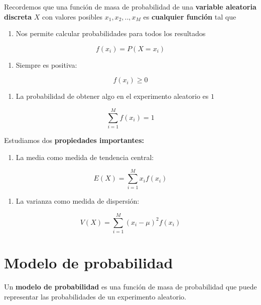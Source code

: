 \documentclass[
]{book}
\providecommand{\tightlist}{%
  \setlength{\itemsep}{0pt}\setlength{\parskip}{0pt}}
\begin{document}
Recordemos que una función de masa de probabilidad de una \textbf{variable aleatoria discreta} \(X\) con valores posibles \(x_1 , x_2 , .. , x_M\) es \textbf{cualquier función} tal que

\begin{enumerate}
\def\labelenumi{\arabic{enumi})}
\tightlist
\item
  Nos permite calcular probabilidades para todos los resultados
\end{enumerate}

\[f(x_i)=P(X=x_i)\]

\begin{enumerate}
\def\labelenumi{\arabic{enumi})}
\setcounter{enumi}{1}
\tightlist
\item
  Siempre es positiva:
\end{enumerate}

\[f(x_i)\geq 0\]

\begin{enumerate}
\def\labelenumi{\arabic{enumi})}
\setcounter{enumi}{2}
\tightlist
\item
  La probabilidad de obtener algo en el experimento aleatorio es \(1\)
\end{enumerate}

\[\sum_{i=1}^M f(x_i)=1\]

Estudiamos dos \textbf{propiedades importantes:}

\begin{enumerate}
\def\labelenumi{\arabic{enumi})}
\tightlist
\item
  La media como medida de tendencia central:
\end{enumerate}

\[E(X)= \sum_{i=1}^M x_i f(x_i)\]

\begin{enumerate}
\def\labelenumi{\arabic{enumi})}
\setcounter{enumi}{1}
\tightlist
\item
  La varianza como medida de dispersión:
\end{enumerate}

\[V(X)= \sum_{i=1}^M (x_i-\mu)^2 f(x_i)\]

\hypertarget{modelo-de-probabilidad}{%
\section{Modelo de probabilidad}\label{modelo-de-probabilidad}}

Un \textbf{modelo de probabilidad} es una función de masa de probabilidad que puede representar las probabilidades de un experimento aleatorio.
\end{document}
